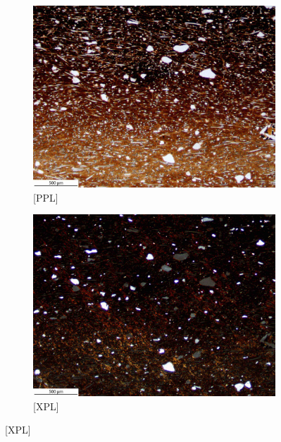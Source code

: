 \documentclass[a4paper]{article}
\begin{document}
\begin{figure}[H]
	\begin{subfigure}[t]{.49\textwidth}
		\includegraphics[width=\textwidth]{ThinSections/43-2_4x_PPL.jpg}
		\caption{[PPL]}
	\end{subfigure}\hspace{.5em}\hfill
	\begin{subfigure}[t]{.49\textwidth}
		\includegraphics[width=\textwidth]{ThinSections/43-2_4x_XPL.jpg}
		\caption{[XPL]}
	\end{subfigure}

\end{figure}
\end{document}
